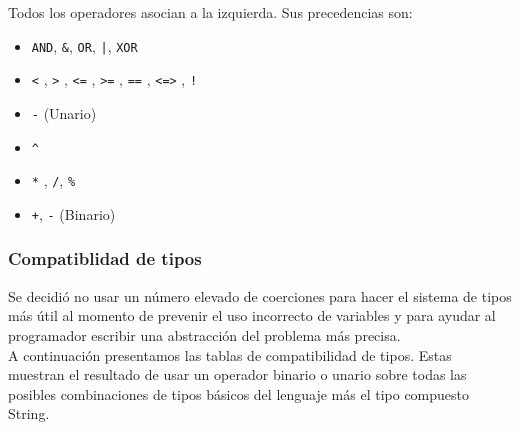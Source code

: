 \documentclass[12pt, spanish]{report}
\begin{document}
Todos los operadores asocian a la izquierda. Sus precedencias son:
\begin{itemize}
\item \texttt{AND}, \texttt{\&}, \texttt{OR}, \texttt{|}, \texttt{XOR}
\item \texttt{<} , \texttt{>} , \texttt{<=} , \texttt{>=} , \texttt{==} , \texttt{<=>} , \texttt{!}
\item \texttt{-} (Unario)
\item \texttt{\^}
\item \texttt{*} ,  \texttt{/}, \texttt{\%}
\item \texttt{+}, \texttt{-} (Binario)
\end{itemize}

\subsubsection{Compatiblidad de tipos}
Se decidi\'o no usar un n\'umero elevado de coerciones para hacer el
sistema de tipos m\'as \'util al momento de prevenir el uso incorrecto
de variables y para ayudar al programador escribir una abstracci\'on del
problema m\'as precisa.\\
\indent A continuaci\'on presentamos las tablas de compatibilidad de
tipos. Estas muestran el resultado de usar un operador binario o unario sobre
todas las posibles combinaciones de tipos b\'asicos del lenguaje m\'as
el tipo compuesto String.\\
\end{document}
